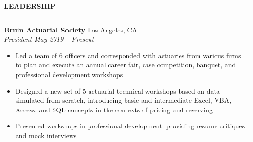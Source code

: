 \documentclass[11pt,letterpaper]{article}
\newcommand{\sectline}{\vspace{4pt}\hrule height 1.5pt\vspace{4pt}}
\newcommand{\sectspace}{\vspace{10pt}}
\begin{document}
\textbf{LEADERSHIP} \sectline
\textbf{Bruin Actuarial Society} \hfill Los Angeles, CA \\
\textit{President} \hfill \textit{May 2019 -- Present}
\begin{itemize}
	\item Led a team of 6 officers and corresponded with actuaries from various firms to plan and execute an annual career fair, case competition, banquet, and professional development workshops
	
	\item Designed a new set of 5 actuarial technical workshops based on data simulated from scratch, introducing basic and intermediate Excel, VBA, Access, and SQL concepts in the contexts of pricing and reserving
	\item Presented workshops in professional development, providing resume critiques and mock interviews

\end{itemize}
\sectspace
\end{document}
